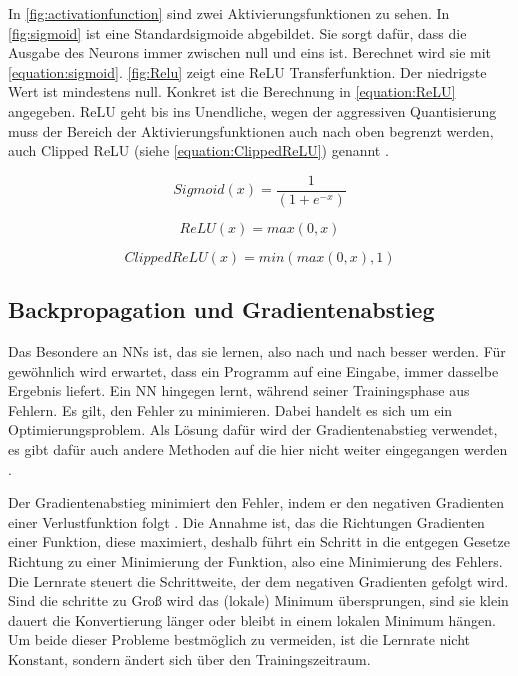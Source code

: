 In \autoref{fig:activationfunction} sind zwei Aktivierungsfunktionen zu sehen. In \autoref{fig:sigmoid} ist eine Standardsigmoide abgebildet. Sie sorgt dafür, dass die Ausgabe des Neurons immer zwischen null und eins ist. Berechnet wird sie mit \autoref{equation:sigmoid}. \autoref{fig:Relu} zeigt eine \ac{ReLU} Transferfunktion. Der niedrigste Wert ist mindestens null. Konkret ist die Berechnung in \autoref{equation:ReLU} angegeben. \ac{ReLU} geht bis ins Unendliche, wegen der aggressiven Quantisierung muss der Bereich der Aktivierungsfunktionen auch nach oben begrenzt werden, auch Clipped \ac{ReLU} (siehe \autoref{equation:ClippedReLU}) genannt \cite{StockfishNNUE}.

\begin{equation}
  Sigmoid(x)=\frac{1}{(1+e^{-x})}
  \label{equation:sigmoid}
\end{equation}

\begin{equation}
  ReLU(x)=max(0,x)
  \label{equation:ReLU}
\end{equation}

\begin{equation}
  ClippedReLU(x)=min(max(0,x),1)
  \label{equation:ClippedReLU}
\end{equation}


\subsection{Backpropagation und Gradientenabstieg}
\label{chap:bpGradient}
Das Besondere an \acp{NN} ist, das sie lernen, also nach und nach besser werden. Für gewöhnlich wird erwartet, dass ein Programm auf eine Eingabe, immer dasselbe Ergebnis liefert. Ein \ac{NN} hingegen lernt, während seiner Trainingsphase aus Fehlern. Es gilt, den Fehler zu minimieren. Dabei handelt es sich um ein Optimierungsproblem. Als Lösung dafür wird der Gradientenabstieg verwendet, es gibt dafür auch andere Methoden auf die hier nicht weiter eingegangen werden \cite{StockfishNNUE}.

Der Gradientenabstieg minimiert den Fehler, indem er den negativen Gradienten einer Verlustfunktion folgt \cite{Ruder2016}. Die Annahme ist, das die Richtungen Gradienten einer Funktion, diese maximiert, deshalb führt ein Schritt in die entgegen Gesetze Richtung zu einer Minimierung der Funktion, also eine Minimierung des Fehlers. Die Lernrate steuert die Schrittweite, der dem negativen Gradienten gefolgt wird. Sind die schritte zu Groß wird das (lokale) Minimum übersprungen, sind sie klein dauert die Konvertierung länger oder bleibt in einem lokalen Minimum hängen. Um beide dieser Probleme bestmöglich zu vermeiden, ist die Lernrate nicht Konstant, sondern ändert sich über den Trainingszeitraum.

